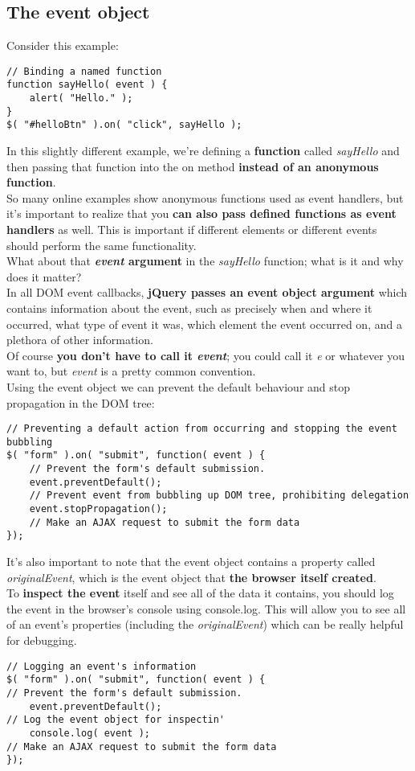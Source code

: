 \documentclass[10pt,letterpaper]{report}
\begin{document}
\subsection{The event object}
Consider this example:
\begin{lstlisting}
// Binding a named function
function sayHello( event ) {
	alert( "Hello." );
}
$( "#helloBtn" ).on( "click", sayHello );
\end{lstlisting}
In this slightly different example, we're defining a \textbf{function} called \textit{sayHello} and then passing that function into the on method \textbf{instead of an anonymous function}.\\ So many online examples show anonymous functions used as event handlers, but it's important to realize that you \textbf{can also pass defined functions as event handlers} as well. This is important if different elements or different events should perform the same functionality.\\
What about that \textbf{\textit{event} argument} in the \textit{sayHello} function; what is it and why does it matter?\\ In all DOM event callbacks, \textbf{jQuery passes an event object argument} which contains information about the event, such as precisely when and where it occurred, what type of event it was, which element the event occurred on, and a plethora of other information.\\ Of course \textbf{you don't have to call it \textit{event}}; you could call it \textit{e} or whatever you want to, but \textit{event} is a pretty common convention.\\
Using the event object we can prevent the default behaviour and stop propagation in the DOM tree:
\begin{lstlisting}
// Preventing a default action from occurring and stopping the event bubbling
$( "form" ).on( "submit", function( event ) {
	// Prevent the form's default submission.
	event.preventDefault();
	// Prevent event from bubbling up DOM tree, prohibiting delegation
	event.stopPropagation();
	// Make an AJAX request to submit the form data
});
\end{lstlisting}
It's also important to note that the event object contains a property called \textit{originalEvent}, which is the event object that \textbf{the browser itself created}.\\
To \textbf{inspect the event} itself and see all of the data it contains, you should log the event in the browser's console using console.log. This will allow you to see all of an event's properties (including the \textit{originalEvent}) which can be really helpful for debugging.
\begin{lstlisting}
// Logging an event's information
$( "form" ).on( "submit", function( event ) {
// Prevent the form's default submission.
	event.preventDefault();
// Log the event object for inspectin'
	console.log( event );
// Make an AJAX request to submit the form data
});
\end{lstlisting}
\end{document}

